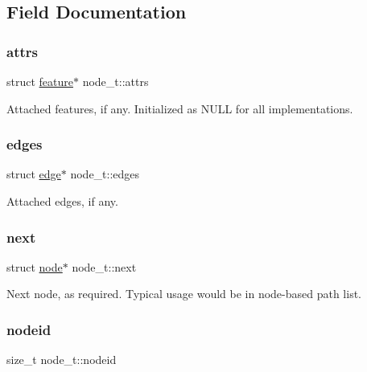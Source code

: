 \subsection{Field Documentation}
\mbox{\label{structnode__t_afa07214493711b8865247610bc4b5bdf}} 
\subsubsection{\texorpdfstring{attrs}{attrs}}
{\footnotesize\ttfamily struct \hyperlink{graphdata_8h_a068417678f021a74e911edd39f8d0bce}{feature}$\ast$ node\+\_\+t\+::attrs}

Attached features, if any. Initialized as N\+U\+LL for all implementations. \mbox{\label{structnode__t_a5134fc88690d419dd465e34c9f7a69bb}} 
\subsubsection{\texorpdfstring{edges}{edges}}
{\footnotesize\ttfamily struct \hyperlink{graphdata_8h_a641a8a4cd064e02a13e6c15d1b2df541}{edge}$\ast$ node\+\_\+t\+::edges}

Attached edges, if any. \mbox{\label{structnode__t_a984d83b78d25abe09e7c4c953ef9d1ad}} 
\subsubsection{\texorpdfstring{next}{next}}
{\footnotesize\ttfamily struct \hyperlink{graphdata_8h_a85b4f4124a5616dea92c9e8a221a8db5}{node}$\ast$ node\+\_\+t\+::next}



Next node, as required. Typical usage would be in node-\/based path list. 

\mbox{\label{structnode__t_a3fe17f2fd1e7a7b2ec5f7bfae826816c}} 
\subsubsection{\texorpdfstring{nodeid}{nodeid}}
{\footnotesize\ttfamily size\+\_\+t node\+\_\+t\+::nodeid}

